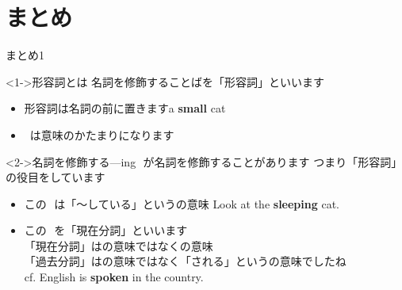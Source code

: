 \documentclass[aspectratio=169,xcolor={dvipsnames,table}]{beamer}
\begin{document}
\section{まとめ}
\begin{frame}[plain]{まとめ1}

  \begin{block}<1->{形容詞とは}\small
    名詞を修飾することばを「形容詞」といいます
    \begin{itemize}[square]\small
      \setlength{\itemsep}{5pt}
      \item 形容詞は名詞の前に置きます\hfill{\small a \textbf{small} cat}
      \item {}\,\,\,は意味のかたまりになります
    \end{itemize}
  \end{block}

  \begin{block}<2->{名詞を修飾する---ing}\small
    \,\,が名詞を修飾することがあります%
    \hfill{\scriptsize つまり「形容詞」の役目をしています}

    \begin{itemize}[square]\small
      \setlength{\itemsep}{5pt}
      \item この\,\,\,\,は「～している」というの意味%
            \hfill{\small Look at the \textbf{sleeping} cat.}
      \item この\,\,\,\,を「現在分詞」といいます\\
            {\scriptsize \textdbend\textdbend 「現在分詞」はの意味ではなくの意味}\\
            \hfill{\scriptsize 「過去分詞」はの意味ではなく「される」というの意味でしたね}\\
            \hfill{\small cf.  English is \textbf{spoken} in the country.}
    \end{itemize}
  \end{block}

\end{frame}
\end{document}
